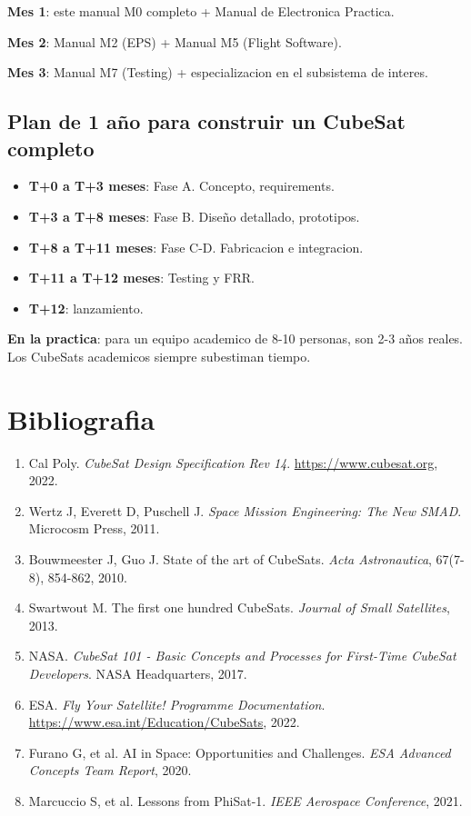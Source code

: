 \documentclass[11pt,a4paper,oneside,openright]{book}
\begin{document}
\textbf{Mes 1}: este manual M0 completo + Manual de Electronica Practica.

\textbf{Mes 2}: Manual M2 (EPS) + Manual M5 (Flight Software).

\textbf{Mes 3}: Manual M7 (Testing) + especializacion en el subsistema de
interes.

\section{Plan de 1 año para construir un CubeSat completo}

\begin{itemize}[leftmargin=2em]
  \item \textbf{T+0 a T+3 meses}: Fase A. Concepto, requirements.
  \item \textbf{T+3 a T+8 meses}: Fase B. Diseño detallado, prototipos.
  \item \textbf{T+8 a T+11 meses}: Fase C-D. Fabricacion e integracion.
  \item \textbf{T+11 a T+12 meses}: Testing y FRR.
  \item \textbf{T+12}: lanzamiento.
\end{itemize}

\textbf{En la practica}: para un equipo academico de 8-10 personas, son
2-3 años reales. Los CubeSats academicos siempre subestiman tiempo.

\backmatter

\chapter*{Bibliografia}

\begin{enumerate}[leftmargin=2em]
\item Cal Poly. \emph{CubeSat Design Specification Rev 14}.
  \url{https://www.cubesat.org}, 2022.
\item Wertz J, Everett D, Puschell J. \emph{Space Mission Engineering: The
  New SMAD}. Microcosm Press, 2011.
\item Bouwmeester J, Guo J. State of the art of CubeSats. \emph{Acta
  Astronautica}, 67(7-8), 854-862, 2010.
\item Swartwout M. The first one hundred CubeSats. \emph{Journal of Small
  Satellites}, 2013.
\item NASA. \emph{CubeSat 101 - Basic Concepts and Processes for
  First-Time CubeSat Developers}. NASA Headquarters, 2017.
\item ESA. \emph{Fly Your Satellite! Programme Documentation}.
  \url{https://www.esa.int/Education/CubeSats}, 2022.
\item Furano G, et al. AI in Space: Opportunities and Challenges.
  \emph{ESA Advanced Concepts Team Report}, 2020.
\item Marcuccio S, et al. Lessons from PhiSat-1. \emph{IEEE Aerospace
  Conference}, 2021.
\end{enumerate}
\end{document}
